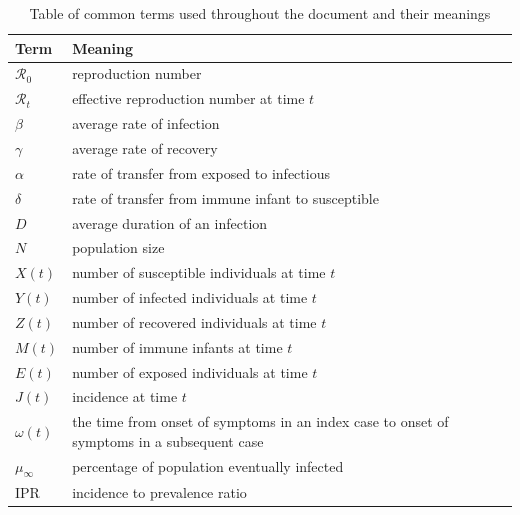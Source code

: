 \documentclass[12pt]{article}
\newcommand{\rr}{\ensuremath{\mathcal{R}_0}}
\begin{document}
\begin{table}[]
\centering
\begin{tabular}{@{}ll@{}}
\toprule
Term        & Meaning                                                                                    \\ \midrule
$\rr$     & reproduction number                                                                        \\
$\mathcal{R}_t$     & effective reproduction number at time $t$                                                  \\
$\beta$     & average rate of infection                                                                  \\
$\gamma$    & average rate of recovery                                                                   \\
$\alpha$    & rate of transfer from exposed to infectious                                                \\
$\delta$    & rate of transfer from immune infant to susceptible                                         \\
$D$         & average duration of an infection                                                           \\
$N$         & population size                                                                            \\
$X(t)$      & number of susceptible individuals at time $t$                                              \\
$Y(t)$      & number of infected individuals at time $t$                                                 \\
$Z(t)$      & number of recovered individuals at time $t$                                                \\
$M(t)$      & number of immune infants at time $t$                                                       \\
$E(t)$      & number of exposed individuals at time $t$                                                  \\
$J(t)$      & incidence at time $t$                                                                      \\
$\omega(t)$ & the time from onset of symptoms in an index case to onset of symptoms in a subsequent case \\
$\mu_\infty$       & percentage of population eventually infected                                               \\
IPR         & incidence to prevalence ratio                                                             \\ \bottomrule
\end{tabular}
\caption{Table of common terms used throughout the document and their meanings}\label{tab:terms}
\end{table}
\end{document}
